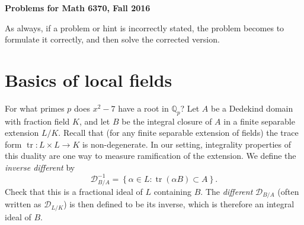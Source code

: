\documentclass[11pt,answers,addpoints,reqno]{exam}
\theoremstyle{definition}
\theoremstyle{remark}
\theoremstyle{definition}
\theoremstyle{remark}
\theoremstyle{remark}
\theoremstyle{remark}
\newcommand{\Q}{\mathbb{Q}}
\DeclareMathOperator{\tr}{tr}
\newcommand{\mc}{\mathcal}
\begin{document}
\begin{center}
\bf{Problems for Math 6370, Fall 2016}
\end{center}
As always, if a problem or hint is incorrectly stated, the problem becomes to formulate it correctly, and then solve the corrected version.
\section{Basics of local fields}

\begin{questions}
\question For what primes $p$ does $x^2-7$ have a root in $\Q_p$?
\question Let $A$ be a Dedekind domain with fraction field $K$, and let $B$ be
the integral closure of $A$ in a finite separable extension $L/K$. Recall that (for any finite separable extension of fields) the trace form $\tr \colon L \times L \to K$ is non-degenerate. In our setting, integrality properties of this duality are one way to measure ramification of the extension. We define the \textit{inverse different} by
\[
\mc{D}^{-1}_{B/A}= \left\{ \alpha \in L: \tr(\alpha B) \subset A \right\}. 
\]
Check that this is a fractional ideal of $L$ containing $B$. The \textit{different} $\mc{D}_{B/A}$ (often written as $\mc{D}_{L/K}$) is then defined to be its inverse, which is therefore an integral ideal of $B$.
\end{questions}
\end{document}
